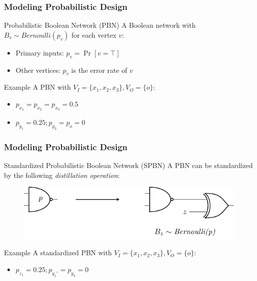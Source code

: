 \begin{frame}
  \frametitle{Modeling Probabilistic Design}
  \begin{block}{Probabilistic Boolean Network (PBN)}
    A Boolean network with $B_v\sim\textit{Bernoulli}(p_v)$ for each vertex $v$:
    \pause
    \begin{itemize}
      \item Primary inputs: $p_v=\Pr[v=\top]$
            \pause
      \item Other vertices: $p_v$ is the error rate of $v$
    \end{itemize}
  \end{block}
  \pause
  \begin{block}{Example}
    A PBN with $V_I=\{x_1,x_2,x_3\},V_O=\{o\}$:
    \begin{figure}
      \centering
      
    \end{figure}
    \pause
    \begin{itemize}
      \item $p_{x_1}=p_{x_2}=p_{x_3}=0.5$
            \pause
      \item $p_{y_1}=0.25;p_{y_2}=p_{o}=0$
    \end{itemize}
  \end{block}
\end{frame}

\begin{frame}
  \frametitle{Modeling Probabilistic Design}
  \begin{block}{Standardized Probabilistic Boolean Network (SPBN)}
    A PBN can be standardized by the following \textit{distillation operation}:
    \pause
    \begin{figure}
      \centering
      \includegraphics[scale=0.8]{fig/prob-design-eval/prob-distillation.pdf}
    \end{figure}
  \end{block}
  \pause
  \begin{block}{Example}
    A standardized PBN with $V_I=\{x_1,x_2,x_3\},V_O=\{o\}$:
    \begin{figure}
      \centering
      
    \end{figure}
    \pause
    \begin{itemize}
      \item $p_{z_1}=0.25;p_{y_1'}=p_{y_3}=0$
    \end{itemize}
  \end{block}
\end{frame}